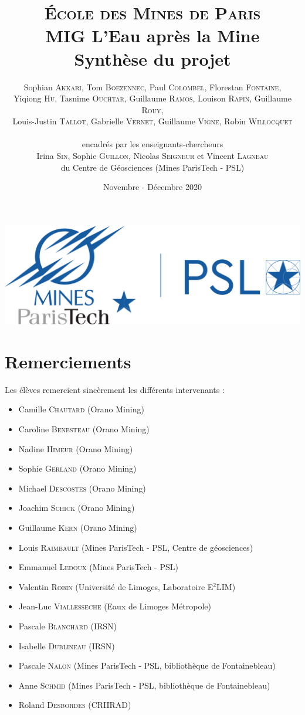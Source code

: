 \documentclass{article}
\title{ \textbf{ {\color{couleurmines}
\Huge{\textsc{École des Mines de Paris}}\\
\vspace{1.5 cm}
MIG L'Eau après la Mine\\\vspace{1 cm}Synthèse du projet}}
\vspace{1 cm}
}
\author{%
Sophian \textsc{Akkari},
Tom \textsc{Boezennec}, 
Paul \textsc{Colombel}, 
Florestan \textsc{Fontaine},\\
Yiqiong \textsc{Hu}, 
Tasnime \textsc{Ouchtar}, 
Guillaume \textsc{Ramos}, 
Louison \textsc{Rapin}, 
Guillaume \textsc{Rouy},\\ 
Louis-Justin \textsc{Tallot}, 
Gabrielle \textsc{Vernet}, 
Guillaume \textsc{Vigne}, 
Robin \textsc{Willocquet}\\
\\ encadrés par les enseignants-chercheurs \\
Irina \textsc{Sin}, 
Sophie \textsc{Guillon}, 
Nicolas \textsc{Seigneur}
et Vincent \textsc{Lagneau} \\
du Centre de Géosciences (Mines ParisTech - PSL)}
\date{Novembre - Décembre 2020}
\begin{document}

\maketitle
\thispagestyle{empty}
\vspace{1 cm}
\begin{center}
    \includegraphics[width = 0.4\linewidth]{logoMPT.png}
\end{center}
\newpage
{}

\section*{Remerciements}
Les élèves remercient sincèrement les différents intervenants : 
\begin{itemize}
    \item Camille \textsc{Chautard} (Orano Mining)
    \item Caroline \textsc{Benesteau} (Orano Mining)
    \item Nadine \textsc{Himeur} (Orano Mining)
    \item Sophie \textsc{Gerland} (Orano Mining)
    \item Michael \textsc{Descostes} (Orano Mining)
    \item Joachim \textsc{Schick} (Orano Mining)
    \item Guillaume \textsc{Kern} (Orano Mining)
    \item Louis \textsc{Raimbault} (Mines ParisTech - PSL, Centre de géosciences) 
    \item  Emmanuel \textsc{Ledoux} (Mines ParisTech - PSL)
    \item Valentin \textsc{Robin} (Université de Limoges, Laboratoire E$^2$LIM) 
    \item Jean-Luc \textsc{Viallesseche} (Eaux de Limoges Métropole)
    \item Pascale \textsc{Blanchard} (IRSN)  
    \item Isabelle \textsc{Dublineau} (IRSN)    
    \item  Pascale \textsc{Nalon} (Mines ParisTech - PSL, bibliothèque de Fontainebleau)
    \item Anne \textsc{Schmid} (Mines ParisTech - PSL, bibliothèque de Fontainebleau)
    \item Roland \textsc{Desbordes} (CRIIRAD)
\end{itemize}
\end{document}
